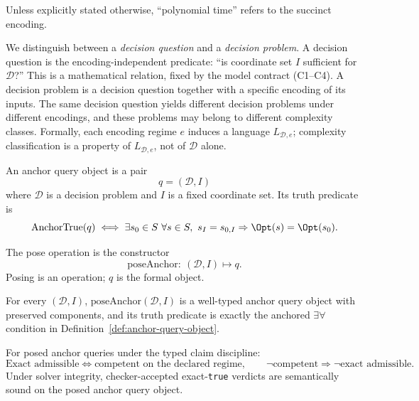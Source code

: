 Unless explicitly stated otherwise, ``polynomial time'' refers to the succinct encoding.

\begin{remark}\label{rem:question-vs-problem}
We distinguish between a \emph{decision question} and a \emph{decision problem}. A decision question is the encoding-independent predicate: ``is coordinate set $I$ sufficient for $\mathcal{D}$?'' This is a mathematical relation, fixed by the model contract (C1--C4). A decision problem is a decision question together with a specific encoding of its inputs. The same decision question yields different decision problems under different encodings, and these problems may belong to different complexity classes. Formally, each encoding regime $e$ induces a language $L_{\mathcal{D},e}$; complexity classification is a property of $L_{\mathcal{D},e}$, not of $\mathcal{D}$ alone.
\end{remark}

\begin{definition}\label{def:anchor-query-object}
An anchor query object is a pair
\[
q=(\mathcal{D},I)
\]
where $\mathcal{D}$ is a decision problem and $I$ is a fixed coordinate set. Its truth predicate is
\[
\mathrm{AnchorTrue}(q)\iff
\exists s_0\in S\ \forall s\in S,\ s_I=s_{0,I}\Rightarrow \Opt(s)=\Opt(s_0).
\]
\end{definition}

\begin{definition}\label{def:pose-anchor-query}
The pose operation is the constructor
\[
\mathrm{poseAnchor}:\ (\mathcal{D},I)\mapsto q.
\]
Posing is an operation; $q$ is the formal object.
\end{definition}

\begin{proposition}\label{prop:pose-anchor-object}
For every $(\mathcal{D},I)$, $\mathrm{poseAnchor}(\mathcal{D},I)$ is a well-typed anchor query object with preserved components, and its truth predicate is exactly the anchored $\exists\forall$ condition in Definition~\ref{def:anchor-query-object}.
\end{proposition}

\begin{proposition}\label{prop:posed-anchor-typed-exact}
For posed anchor queries under the typed claim discipline:
\[
\text{Exact admissible}\iff\text{competent on the declared regime},\qquad
\neg\text{competent}\Rightarrow\neg\text{exact admissible}.
\]
Under solver integrity, checker-accepted exact-\texttt{true} verdicts are semantically sound on the posed anchor query object.
\end{proposition}

